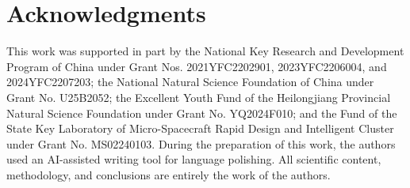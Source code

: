 \documentclass[journal]{new-aiaa}
\begin{document}
\section*{Acknowledgments}

This work was supported in part by the National Key Research and Development Program of China under Grant Nos. 2021YFC2202901, 2023YFC2206004, and 2024YFC2207203; the National Natural Science Foundation of China under Grant No. U25B2052; the Excellent Youth Fund of the Heilongjiang Provincial Natural Science Foundation under Grant No. YQ2024F010; and the Fund of the State Key Laboratory of Micro-Spacecraft Rapid Design and Intelligent Cluster under Grant No. MS02240103.
During the preparation of this work, the authors used an AI-assisted writing tool for language polishing. All scientific content, methodology, and conclusions are entirely the work of the authors.

\newpage

\end{document}
